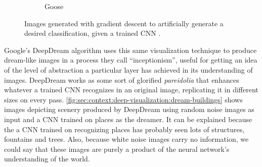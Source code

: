 \begin{figure}[t]
\begin{subfigure}[b]{0.3\textwidth}
    \caption{Goose}
    \label{fig:sec:context:deep-visualization-class-6}
  \end{subfigure}
  \caption{
    Images generated with gradient descent to artificially generate a desired classification, given a trained CNN \cite{Simonyan2014B}.
  }
  \label{fig:sec:context:deep-visualization-class}
\end{figure}

Google's DeepDream algorithm \cite{Mordvintsev2015} uses this same visualization technique to produce dream-like images in a process they call ``inceptionism'', useful for getting an idea of the level of abstraction a particular layer has achieved in its understanding of images.
DeepDream works as some sort of glorified \emph{pareidolia} that enhances whatever a trained CNN recognizes in an original image, replicating it in different sizes on every pass.
\autoref{fig:sec:context:deep-visualization:dream-buildings} shows images depicting scenery produced by DeepDream using random noise images as input and a CNN trained on places as the dreamer.
It can be explained because the a CNN trained on recognizing places has probably seen lots of structures, fountains and trees.
Also, because white noise images carry no information, we could say that these images are purely a product of the neural network's understanding of the world.

